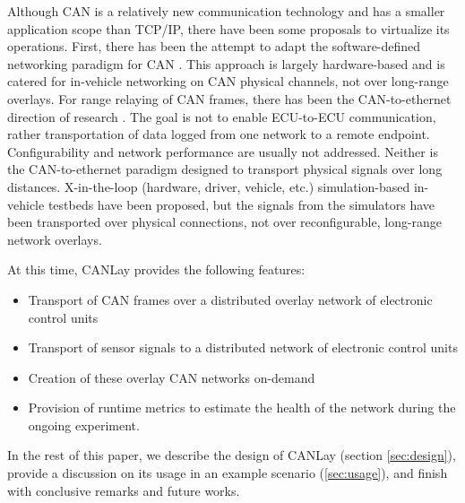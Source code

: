 \documentclass[letterpaper,twocolumn,12pt]{article}
\begin{document}
Although CAN is a relatively new communication technology and has a smaller application scope than TCP/IP, there have been some proposals to virtualize its operations. 
First, there has been the attempt to adapt the software-defined networking paradigm for CAN \cite{rotermund_requirements_2020,doering_retrofitting_nodate,grewe_bloomycan_2021}. This approach is largely hardware-based and is catered for in-vehicle networking on CAN physical channels, not over long-range overlays. For range relaying of CAN frames, there has been the CAN-to-ethernet direction of research \cite{johanson_relaying_2009,florian_polzlbauer_experience_2019}. The goal is not to enable ECU-to-ECU communication, rather transportation of data logged from one network to a remote endpoint. Configurability and network performance are usually not addressed. Neither is the CAN-to-ethernet paradigm designed to transport physical signals over long distances. 
X-in-the-loop (hardware, driver, vehicle, etc.) simulation-based in-vehicle testbeds \cite{appel_safety_2020} have been proposed, but the signals from the simulators have been transported over physical connections, not over reconfigurable, long-range network overlays. 

At this time, CANLay provides the following features:
\begin{itemize}
    \item Transport of CAN frames over a distributed overlay network of electronic control units
    \item Transport of sensor signals to a distributed network of electronic control units
    \item Creation of these overlay CAN networks on-demand
    \item Provision of runtime metrics to estimate the health of the network during the ongoing experiment.
\end{itemize}
In the rest of this paper, we describe the design of CANLay (section \ref{sec:design}), provide a discussion on its usage in an example scenario (\ref{sec:usage}), and finish with conclusive remarks and future works.
\end{document}
